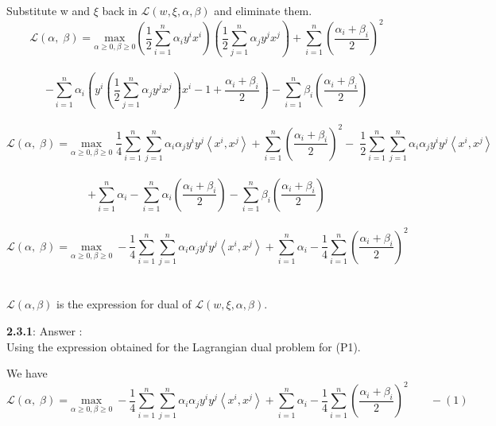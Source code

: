 \documentclass[a4paper,11pt]{article}
\begin{document}
\begin{mlsolution}
Substitute w and $\xi$ back in $\mathcal{L}(w, \xi, \alpha, \beta)$ and eliminate them.\\

\[
  \mathcal{L}\left ( \alpha,\; \beta  \right ) = \underset{\alpha\geq 0, \beta \geq 0 }{\text{max}} \left ( \frac{1}{2}\sum_{i=1}^{n} \alpha_{i}y^{i}x^{i}  \right )\left ( \frac{1}{2}\sum_{j=1}^{n} \alpha_{j}y^{j}x^{j} \right ) + \sum_{i=1}^{n} \left ( \frac{\alpha_{i} + \beta_{i}}{2} \right )^{2}  \]\\\[ - \sum_{i=1}^{n} \alpha_{i}\left ( y^{i}\left ( \frac{1}{2}\sum_{j=1}^{n} \alpha_{j}y^{j}x^{j}  \right )x^{i} - 1  +  \frac{\alpha_{i} + \beta_{i}}{2} \right ) - \sum_{i=1}^{n} \beta_{i} \left ( \frac{\alpha_{i} + \beta_{i}}{2}  \right )
\]\\

\[
  \mathcal{L}\left ( \alpha,\; \beta  \right ) = \underset{\alpha\geq 0, \beta \geq 0 }{\text{max}} \; \frac{1}{4}\sum_{i=1}^{n}\sum_{j=1}^{n}\alpha_{i}\alpha_{j}y^{i}y^{j}\left \langle x^{i}, x^{j} \right \rangle+ \sum_{i=1}^{n} \left ( \frac{\alpha_{i} + \beta_{i}}{2} \right )^{2} -\; \frac{1}{2}\sum_{i=1}^{n}\sum_{j=1}^{n}\alpha_{i}\alpha_{j}y^{i}y^{j}\left \langle x^{i}, x^{j} \right \rangle \]\\\[ + \sum_{i=1}^{n}\alpha_{i} - \sum_{i=1}^{n} \alpha_{i} \left ( \frac{\alpha_{i} + \beta_{i}}{2}  \right ) - \sum_{i=1}^{n} \beta_{i} \left ( \frac{\alpha_{i} + \beta_{i}}{2}  \right )
\]\\

\[
  \mathcal{L}\left ( \alpha,\; \beta  \right ) = \underset{\alpha\geq 0, \beta \geq 0 }{\text{max}} \; -\frac{1}{4}\sum_{i=1}^{n}\sum_{j=1}^{n}\alpha_{i}\alpha_{j}y^{i}y^{j}\left \langle x^{i}, x^{j} \right \rangle+ \sum_{i=1}^{n}\alpha_{i} - \frac{1}{4}\sum_{i=1}^{n} \left ( \frac{\alpha_{i} + \beta_{i}}{2} \right )^{2}
\]\\\\

$\mathcal{L}(\alpha, \beta)$ is the expression for dual of $\mathcal{L}(w, \xi, \alpha, \beta)$.\\
\newpage

\textbf{2.3.1}: Answer : \\

Using the expression obtained for the Lagrangian dual problem for (P1).

We have 
\[
  \mathcal{L}\left ( \alpha,\; \beta  \right ) = \underset{\alpha\geq 0, \beta \geq 0 }{\text{max}} \; -\frac{1}{4}\sum_{i=1}^{n}\sum_{j=1}^{n}\alpha_{i}\alpha_{j}y^{i}y^{j}\left \langle x^{i}, x^{j} \right \rangle+ \sum_{i=1}^{n}\alpha_{i} - \frac{1}{4}\sum_{i=1}^{n} \left ( \frac{\alpha_{i} + \beta_{i}}{2} \right )^{2} \;\;\;\;\;\;\; - (1)
\]\\


\end{mlsolution}
\end{document}
